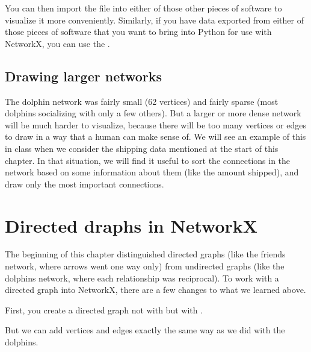 \documentclass[letterpaper,10pt,english]{sphinxmanual}
\begin{document}
You can then import the  file into either of those other pieces of software to visualize it more conveniently.  Similarly, if you have data exported from either of those pieces of software that you want to bring into Python for use with NetworkX, you can use the .


\subsection{Drawing larger networks}
\label{\detokenize{chapter-15-networks:drawing-larger-networks}}
The dolphin network was fairly small (62 vertices) and fairly sparse (most dolphins socializing with only a few others).  But a larger or more dense network will be much harder to visualize, because there will be too many vertices or edges to draw in a way that a human can make sense of.  We will see an example of this in class when we consider the shipping data mentioned at the start of this chapter.  In that situation, we will find it useful to sort the connections in the network based on some information about them (like the amount shipped), and draw only the most important connections.


\section{Directed draphs in NetworkX}
\label{\detokenize{chapter-15-networks:directed-draphs-in-networkx}}
The beginning of this chapter distinguished directed graphs (like the friends network, where arrows went one way only) from undirected graphs (like the dolphins network, where each relationship was reciprocal).  To work with a directed graph into NetworkX, there are a few changes to what we learned above.

First, you create a directed graph not with  but with .

\begin{sphinxVerbatim}[commandchars=\\\{\}]
  
\end{sphinxVerbatim}

But we can add vertices and edges exactly the same way as we did with the dolphins.
\end{document}
